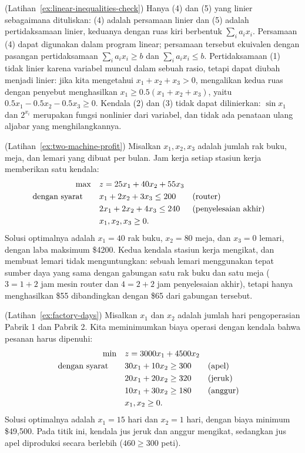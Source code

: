 \begin{solution}(Latihan~\ref{ex:linear-inequalities-check})
Hanya (4) dan (5) yang linier sebagaimana dituliskan: (4) adalah persamaan linier dan (5) adalah pertidaksamaan linier, keduanya dengan ruas kiri berbentuk $\sum_i a_i x_i$. Persamaan (4) dapat digunakan dalam program linear; persamaan tersebut ekuivalen dengan pasangan pertidaksamaan $\sum_i a_i x_i \geq b$ dan $\sum_i a_i x_i \leq b$.
Pertidaksamaan (1) tidak linier karena variabel muncul dalam sebuah rasio, tetapi dapat diubah menjadi linier: jika kita mengetahui $x_1 + x_2 + x_3 > 0$, mengalikan kedua ruas dengan penyebut menghasilkan $x_1 \geq 0.5(x_1 + x_2 + x_3)$, yaitu $0.5x_1 - 0.5x_2 - 0.5x_3 \geq 0$.
Kendala (2) dan (3) tidak dapat dilinierkan: $\sin x_1$ dan $2^{x_i}$ merupakan fungsi nonlinier dari variabel, dan tidak ada penataan ulang aljabar yang menghilangkannya.
\end{solution}

\begin{solution}(Latihan~\ref{ex:two-machine-profit})
Misalkan $x_1, x_2, x_3$ adalah jumlah rak buku, meja, dan lemari yang dibuat per bulan. Jam kerja setiap stasiun kerja memberikan satu kendala:
\begin{align*}
\max \quad & z = 25x_1 + 40x_2 + 55x_3\\
\mbox{dengan syarat}\quad \quad & x_1 + 2x_2 + 3x_3 \leq 200 && \mbox{(router)}\\
& 2x_1 + 2x_2 + 4x_3 \leq 240 && \mbox{(penyelesaian akhir)}\\
& x_1, x_2, x_3 \geq 0.
\end{align*}
Solusi optimalnya adalah $x_1 = 40$ rak buku, $x_2 = 80$ meja, dan $x_3 = 0$ lemari, dengan laba maksimum \$4200. Kedua kendala stasiun kerja mengikat, dan membuat lemari tidak menguntungkan: sebuah lemari menggunakan tepat sumber daya yang sama dengan gabungan satu rak buku dan satu meja ($3=1+2$ jam mesin router dan $4=2+2$ jam penyelesaian akhir), tetapi hanya menghasilkan \$55 dibandingkan dengan \$65 dari gabungan tersebut.
\end{solution}

\begin{solution}(Latihan~\ref{ex:factory-days})
Misalkan $x_1$ dan $x_2$ adalah jumlah hari pengoperasian Pabrik 1 dan Pabrik 2. Kita meminimumkan biaya operasi dengan kendala bahwa pesanan harus dipenuhi:
\begin{align*}
\min \quad & z = 3000x_1 + 4500x_2\\
\mbox{dengan syarat}\quad \quad & 30x_1 + 10x_2 \geq 300 && \mbox{(apel)}\\
& 20x_1 + 20x_2 \geq 320 && \mbox{(jeruk)}\\
& 10x_1 + 30x_2 \geq 180 && \mbox{(anggur)}\\
& x_1, x_2 \geq 0.
\end{align*}
Solusi optimalnya adalah $x_1 = 15$ hari dan $x_2 = 1$ hari, dengan biaya minimum \$49{,}500. Pada titik ini, kendala jus jeruk dan anggur mengikat, sedangkan jus apel diproduksi secara berlebih ($460 \geq 300$ peti).
\end{solution}


